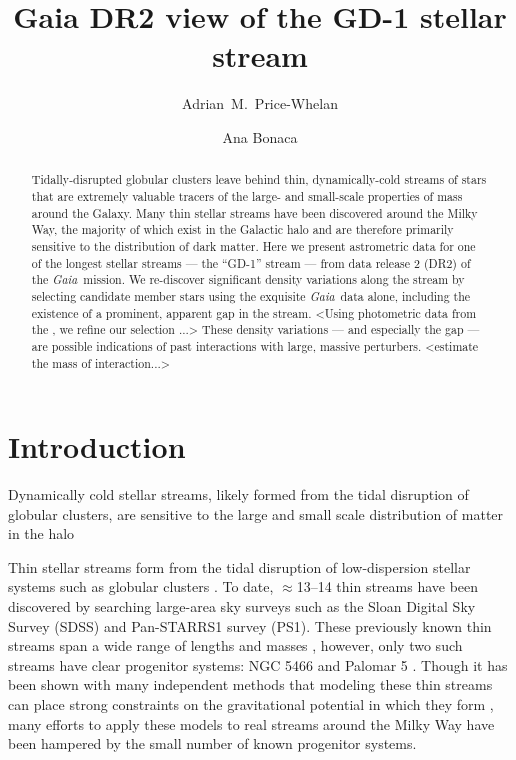 \documentclass[modern]{aastex62}
\newcommand{\acronym}[1]{{\small{#1}}}
\newcommand{\gaia}{\textsl{Gaia}}
\newcommand{\DR}{\acronym{DR2}}
\begin{document}
\sloppy\sloppypar\raggedbottom\frenchspacing %

\title{Gaia DR2 view of the GD-1 stellar stream}

\author[0000-0003-0872-7098]{Adrian~M.~Price-Whelan}

\author[0000-0002-7846-9787]{Ana Bonaca}


\begin{abstract}\noindent %
Tidally-disrupted globular clusters leave behind thin, dynamically-cold streams
of stars that are extremely valuable tracers of the large- and small-scale
properties of mass around the Galaxy.
Many thin stellar streams have been discovered around the Milky Way, the
majority of which exist in the Galactic halo and are therefore primarily
sensitive to the distribution of dark matter.
Here we present astrometric data for one of the longest stellar streams --- the
``GD-1'' stream --- from data release 2 (\DR) of the \gaia\ mission.
We re-discover significant density variations along the stream by selecting
candidate member stars using the exquisite \gaia\ data alone, including the
existence of a prominent, apparent gap in the stream.
<Using photometric data from the \pans, we refine our selection ...>
These density variations --- and especially the gap --- are possible indications
of past interactions with large, massive perturbers.
<estimate the mass of interaction...>
\end{abstract}


\section{Introduction}
\label{sec:intro}

Dynamically cold stellar streams, likely formed from the tidal disruption of globular clusters, are sensitive to the large and small scale distribution of matter in the halo

Thin stellar streams form from the tidal disruption of low-dispersion stellar systems such as globular clusters \citep[e.g.,][]{TODO}. To date, $\approx$13--14 thin streams have been discovered by searching large-area sky surveys such as the Sloan Digital Sky Survey (SDSS) and Pan-STARRS1 survey (PS1). These previously known thin streams span a wide range of lengths \citep[$\sim$$2$--$60$ deg;][]{bernard14,grillmair06} and masses \citep[$\sim$$10^3$--$10^5~\msun$;][]{TODO,TODO}, however, only two such streams have clear progenitor systems: NGC 5466 and Palomar 5 \citep{TODO,TODO}. Though it has been shown with many independent methods that modeling these thin streams can place strong constraints on the gravitational potential in which they form \citep{apw14,TODO}, many efforts to apply these models to real streams around the Milky Way have been hampered by the small number of known progenitor systems.
\end{document}
